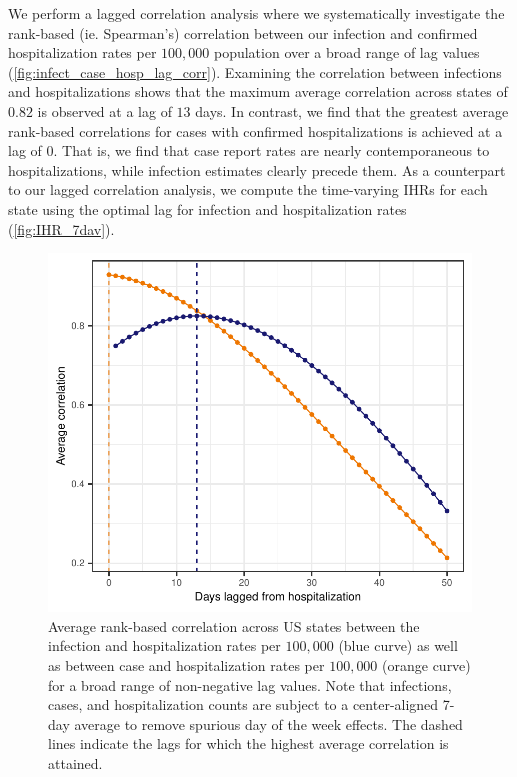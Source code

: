 \documentclass{article}
\begin{document}
We perform a lagged correlation analysis where we systematically investigate the
rank-based (ie. Spearman's) correlation between our infection and confirmed
hospitalization rates per $100,000$ population over a broad range of lag values
(\autoref{fig:infect_case_hosp_lag_corr}). Examining the correlation between infections and
hospitalizations shows that the maximum average correlation across states of $0.82$ is 
observed at a lag of $13$ days. In contrast, we find that the greatest average
rank-based correlations for cases with confirmed hospitalizations is achieved at a lag of
$0$. That is, we find that case report rates are nearly contemporaneous to
hospitalizations, while infection estimates clearly precede them. As a counterpart to our
lagged correlation analysis, we compute the time-varying IHRs for each state using the
optimal lag for infection and hospitalization rates (\autoref{fig:IHR_7dav}). 

\begin{figure}[!tb]
\centering
    \includegraphics[width=.80\textwidth, height=.44\textheight]{infect_case_hosp_lag_corr.pdf} 
    \caption{Average rank-based correlation across US states between the infection and 
    hospitalization rates per $100,000$ (blue curve) as well as between case and 
    hospitalization rates per $100,000$ (orange curve) for a broad range of non-negative
     lag values. Note that infections, cases, and hospitalization counts are subject 
     to a center-aligned 7-day average to remove spurious day of the week effects. 
     The dashed lines indicate the lags for which the highest average correlation is attained.}
    \label{fig:infect_case_hosp_lag_corr}
\end{figure}
\end{document}
